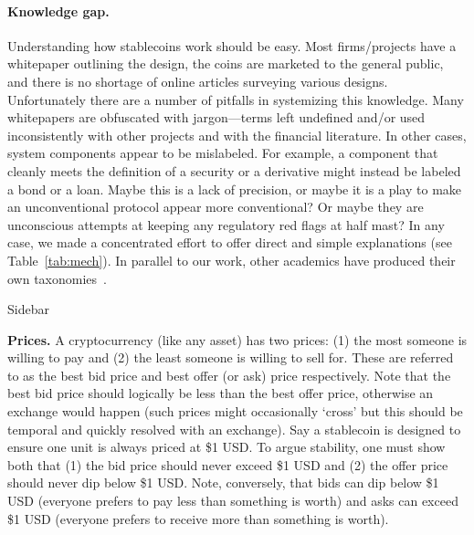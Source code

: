 \paragraph{Knowledge gap.} Understanding how stablecoins work should be easy. Most firms/projects have a whitepaper outlining the design, the coins are marketed to the general public, and there is no shortage of online articles surveying various designs. Unfortunately there are a number of pitfalls in systemizing this knowledge. Many whitepapers are obfuscated with jargon---terms left undefined and/or used inconsistently with other projects and with the financial literature. In other cases, system components appear to be mislabeled. For example, a component that cleanly meets the definition of a security or a derivative might instead be labeled a bond or a loan. Maybe this is a lack of precision, or maybe it is a play to make an unconventional protocol appear more conventional? Or maybe they are unconscious attempts at keeping any regulatory red flags at half mast? In any case, we made a concentrated effort to offer direct and simple explanations (see Table~\ref{tab:mech}). In parallel to our work, other academics have produced their own taxonomies~\cite{PHP+19,MSS20}.

	
\begin{Sidebar*}[h!]
\begin{framed}
Sidebar
\begin{flushleft}
\textbf{Prices.} A cryptocurrency (like any asset) has two prices: (1) the most someone is willing to pay and (2) the least someone is willing to sell for. These are referred to as the best bid price and best offer (or ask) price respectively. Note that the best bid price should logically be less than the best offer price, otherwise an exchange would happen (such prices might occasionally `cross' but this should be temporal and quickly resolved with an exchange). Say a stablecoin is designed to ensure one unit is always priced at \$1 USD. To argue stability, one must show both that (1) the bid price should never exceed \$1 USD and (2) the offer price should never dip below \$1 USD. Note, conversely, that bids can dip below \$1 USD (everyone prefers to pay less than something is worth) and asks can exceed \$1 USD (everyone prefers to receive more than something is worth).
\end{flushleft}
\end{framed}
\end{Sidebar*}


